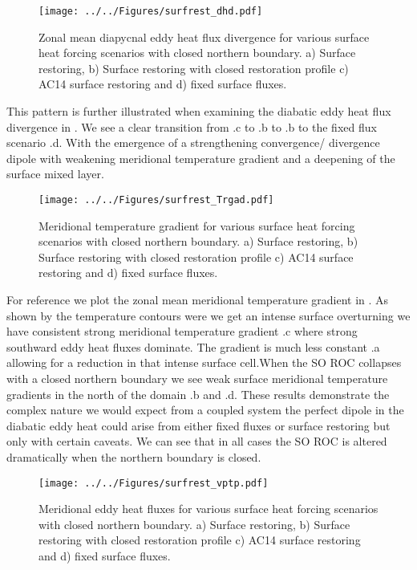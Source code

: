 \begin{figure}[H]
\center
\noindent \texttt{[image: ../../Figures/surfrest\_dhd.pdf]} 
\caption{Zonal mean diapycnal eddy heat flux divergence for various surface heat forcing scenarios with closed northern boundary. a) Surface restoring, b) Surface restoring with closed restoration profile c) AC14 surface restoring and d) fixed surface fluxes.}
\label{fig:srdhd}
\end{figure}
This pattern is further illustrated when examining the diabatic eddy heat flux divergence in . We see a clear transition from .c to .b to .b to the fixed flux scenario .d. With the emergence of a strengthening convergence/ divergence dipole with weakening meridional temperature gradient and a deepening of the surface mixed layer.
\begin{figure}[H]
\center
\noindent \texttt{[image: ../../Figures/surfrest\_Trgad.pdf]} 
\caption{Meridional temperature gradient for various surface heat forcing scenarios with closed northern boundary. a) Surface restoring, b) Surface restoring with closed restoration profile c) AC14 surface restoring and d) fixed surface fluxes.}
\label{fig:srTy}
\end{figure}
For reference we plot the zonal mean meridional temperature gradient in . As shown by the temperature contours were we get an intense surface overturning we have consistent strong meridional temperature gradient .c where strong southward eddy heat fluxes dominate. The gradient is much less constant .a  allowing for a reduction in that intense surface cell.When the SO ROC collapses with a closed northern boundary we see weak surface meridional temperature gradients in the north of the domain .b and .d. These results demonstrate the complex nature we would expect from a coupled system the perfect dipole in the diabatic eddy heat could arise from either fixed fluxes or surface restoring but only with certain caveats. We can see that in all cases the SO ROC is altered dramatically when the northern boundary is closed. 
\begin{figure}[H]
\center
\noindent \texttt{[image: ../../Figures/surfrest\_vptp.pdf]} 
\caption{Meridional eddy heat fluxes for various surface heat forcing scenarios with closed northern boundary. a) Surface restoring, b) Surface restoring with closed restoration profile c) AC14 surface restoring and d) fixed surface fluxes.}
\label{fig:srvptp}
\end{figure}